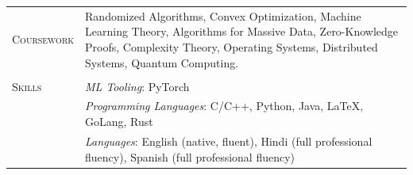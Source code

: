 \documentclass[10pt]{article}
\newlength{\lcol}\setlength{\lcol}{100pt}
\newlength{\rcol}\setlength{\rcol}{\dimexpr\textwidth-\lcol\relax}
\newcommand{\sectionhead}[1]{\textsc{#1}}
\begin{document}
\begin{longtable}{@{}p{\lcol}@{}p{\rcol}@{}}

\sectionhead{Coursework} 
& Randomized Algorithms, Convex Optimization, Machine Learning Theory, Algorithms for Massive Data, Zero-Knowledge Proofs, Complexity Theory, Operating Systems, Distributed Systems, Quantum Computing.
\\ \\



\sectionhead{Skills} 
&\textit{ML Tooling}: PyTorch \\
& \textit{Programming Languages}: C/C++, Python, Java, LaTeX, GoLang, Rust \\
&\textit{Languages}: English (native, fluent), Hindi (full professional fluency), Spanish (full professional fluency)
\\

\end{longtable}
\end{document}
